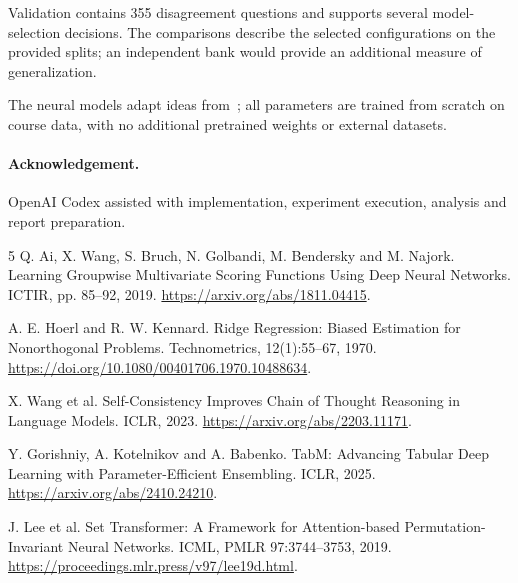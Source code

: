 \documentclass[11pt,a4paper]{article}
\begin{document}
Validation contains 355 disagreement questions and supports several model-selection decisions. The comparisons describe the selected configurations on the provided splits; an independent bank would provide an additional measure of generalization.

The neural models adapt ideas from~\cite{tabm,settransformer}; all parameters are trained from scratch on course data, with no additional pretrained weights or external datasets.

\paragraph{Acknowledgement.}
OpenAI Codex assisted with implementation, experiment execution, analysis and report preparation.

\begin{thebibliography}{5}
 Q. Ai, X. Wang, S. Bruch, N. Golbandi, M. Bendersky and M. Najork. Learning Groupwise Multivariate Scoring Functions Using Deep Neural Networks. ICTIR, pp. 85--92, 2019. \url{https://arxiv.org/abs/1811.04415}.

 A. E. Hoerl and R. W. Kennard. Ridge Regression: Biased Estimation for Nonorthogonal Problems. Technometrics, 12(1):55--67, 1970. \url{https://doi.org/10.1080/00401706.1970.10488634}.

 X. Wang et al. Self-Consistency Improves Chain of Thought Reasoning in Language Models. ICLR, 2023. \url{https://arxiv.org/abs/2203.11171}.

 Y. Gorishniy, A. Kotelnikov and A. Babenko. TabM: Advancing Tabular Deep Learning with Parameter-Efficient Ensembling. ICLR, 2025. \url{https://arxiv.org/abs/2410.24210}.

 J. Lee et al. Set Transformer: A Framework for Attention-based Permutation-Invariant Neural Networks. ICML, PMLR 97:3744--3753, 2019. \url{https://proceedings.mlr.press/v97/lee19d.html}.
\end{thebibliography}
\end{document}
